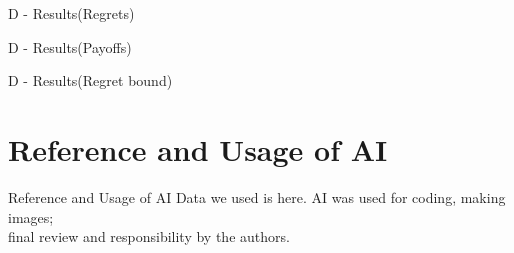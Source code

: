 \documentclass{beamer}
\begin{document}
\begin{frame}{D - Results(Regrets)}

    
\end{frame}

\begin{frame}{D - Results(Payoffs)}

    
\end{frame}

\begin{frame}{D - Results(Regret bound)}

    
\end{frame}

\section{Reference and Usage of AI}
\begin{frame}{Reference and Usage of AI}
    Data we used is here.
    AI was used for coding, making images;\\
    final review and responsibility by the authors.
    
\end{frame}
\end{document}

